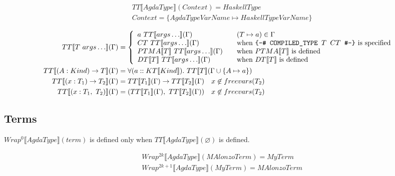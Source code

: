 \begin{align*}
   &TT\llbracket AgdaType \rrbracket(Context) = HaskellType\\
   &Context = \{ AgdaTypeVarName \mapsto HaskellTypeVarName \}
\end{align*}

\begin{align*}
   TT\llbracket T\ args\ldots \rrbracket(\Gamma) &= \left\{
      \begin{array}{l l}
         a\ TT\llbracket args\ldots \rrbracket(\Gamma) &\quad (T \mapsto a) \in \Gamma \\
         CT\ TT\llbracket args\ldots \rrbracket(\Gamma) &\quad
            \text{when \texttt{\{-\# COMPILED\_TYPE \(T\) \(CT\) \#-\}} is specified}\\
         PTMA\llbracket T \rrbracket\ TT\llbracket args\ldots \rrbracket(\Gamma) &\quad
            \text{when \(PTMA\llbracket T \rrbracket\) is defined}\\
         DT\llbracket T \rrbracket\ TT\llbracket args\ldots \rrbracket(\Gamma) &\quad
            \text{when \(DT\llbracket T \rrbracket\) is defined}\\
      \end{array}\right.\\
   TT\llbracket (A : Kind) \rightarrow T \rrbracket(\Gamma) &= \forall (a :: KT\llbracket Kind \rrbracket).
      \ TT\llbracket T \rrbracket(\Gamma \cup \{A \mapsto a\})\\
   TT\llbracket (x : T_1) \rightarrow T_2 \rrbracket(\Gamma) &=
      TT\llbracket T_1 \rrbracket(\Gamma) \rightarrow TT\llbracket T_2 \rrbracket(\Gamma)
      \quad x \not\in freevars(T_2) \\
   TT\llbracket (x : T_1,\ T_2) \rrbracket(\Gamma) &=
      (TT\llbracket T_1 \rrbracket(\Gamma),\ TT\llbracket T_2 \rrbracket(\Gamma))
      \quad x \not\in freevars(T_2) \\
\end{align*}

\subsection{Terms}

\(Wrap^0\llbracket AgdaType \rrbracket(term)\) is defined only when \(TT\llbracket AgdaType \rrbracket(\varnothing)\) is defined.

\begin{align*}
   &Wrap^{2k}\llbracket AgdaType \rrbracket(MAlonzoTerm) = MyTerm\\
   &Wrap^{2k + 1}\llbracket AgdaType \rrbracket(MyTerm) = MAlonzoTerm
\end{align*}

